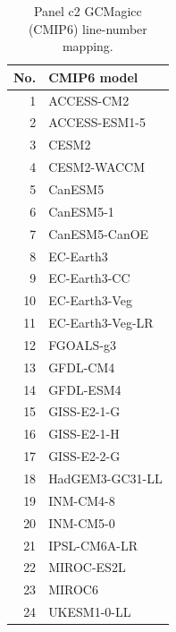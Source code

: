 \begin{table}[tp]
\centering
\footnotesize
\begin{tabular}{rl}
\toprule
No. & CMIP6 model \\
\midrule
1 & ACCESS-CM2 \\
2 & ACCESS-ESM1-5 \\
3 & CESM2 \\
4 & CESM2-WACCM \\
5 & CanESM5 \\
6 & CanESM5-1 \\
7 & CanESM5-CanOE \\
8 & EC-Earth3 \\
9 & EC-Earth3-CC \\
10 & EC-Earth3-Veg \\
11 & EC-Earth3-Veg-LR \\
12 & FGOALS-g3 \\
13 & GFDL-CM4 \\
14 & GFDL-ESM4 \\
15 & GISS-E2-1-G \\
16 & GISS-E2-1-H \\
17 & GISS-E2-2-G \\
18 & HadGEM3-GC31-LL \\
19 & INM-CM4-8 \\
20 & INM-CM5-0 \\
21 & IPSL-CM6A-LR \\
22 & MIROC-ES2L \\
23 & MIROC6 \\
24 & UKESM1-0-LL \\
\bottomrule
\end{tabular}
\caption{Panel c2 GCMagicc (CMIP6) line-number mapping.}
\label{tab:figure2_panel_c2_gcmagicc_cmip6_model_numbers}
\end{table}
